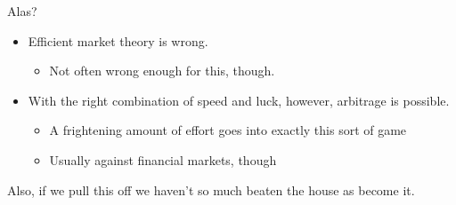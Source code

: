 \documentclass[pdf]{beamer}
\begin{document}
\begin{frame}{Alas?}

  \begin{itemize}
  \item Efficient market theory is wrong.
    \begin{itemize}
    \item Not often wrong enough for this, though.
    \end{itemize}
  \pause\item With the right combination of speed and luck, however, arbitrage is possible.
  \begin{itemize}
  \item A frightening amount of effort goes into exactly this sort of game
  \item Usually against financial markets, though
  \end{itemize}
  \end{itemize}
  
\pause

Also, if we pull this off we haven't so much beaten the house as become it.

\end{frame}
\end{document}
